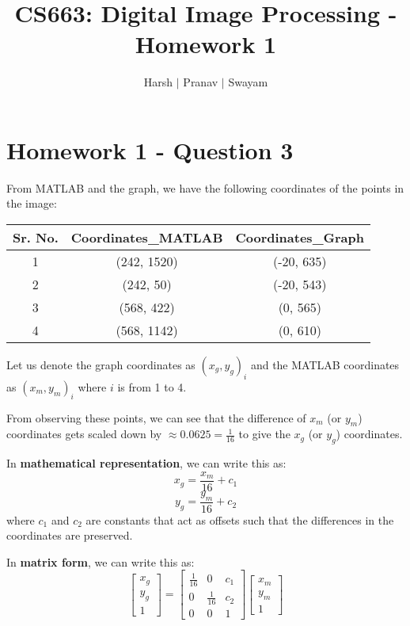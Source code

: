 \documentclass{article}
\title{CS663: Digital Image Processing - Homework 1}
\author{Harsh $\vert$ Pranav $\vert$ Swayam}
\begin{document}
\maketitle
\section{Homework 1 - Question 3}

From MATLAB and the graph, we have the following coordinates of the points in the image:
\begin{table}[H]
\centering
\begin{tabular}{|c|c|c|}
\hline
Sr. No. & Coordinates\_MATLAB & Coordinates\_Graph \\
\hline
1 & (242, 1520) & (-20, 635) \\
\hline
2 & (242, 50) & (-20, 543) \\
\hline
3 & (568, 422) & (0, 565) \\
\hline
4 & (568, 1142) & (0, 610) \\
\hline
\end{tabular}
\end{table}

Let us denote the graph coordinates as $(x_g, y_g)_i$ and the MATLAB coordinates as $(x_m, y_m)_i$ where $i$ is from 1 to 4.

\vspace{5pt}
From observing these points, we can see that the difference of $x_m$ (or $y_m$) coordinates gets scaled down by $\approx 0.0625 = \frac{1}{16}$ to give the $x_g$ (or $y_g$) coordinates.

\hrulefill

\vspace{5pt}
In {\bf mathematical representation}, we can write this as:
\begin{equation}
x_g = \frac{x_m}{16} + c_1
\end{equation}
\begin{equation}
y_g = \frac{y_m}{16} + c_2
\end{equation}
where $c_1$ and $c_2$ are constants that act as offsets such that the differences in the coordinates are preserved.

\hrulefill

\vspace{5pt}
In \textbf{matrix form}, we can write this as:
\begin{equation}
\begin{bmatrix}
x_g \\
y_g \\
1
\end{bmatrix}
=
\begin{bmatrix}
\frac{1}{16} & 0 & c_1 \\
0 & \frac{1}{16} & c_2 \\
0 & 0 & 1
\end{bmatrix}
\begin{bmatrix}
x_m \\
y_m \\
1
\end{bmatrix}
\end{equation}
\end{document}
